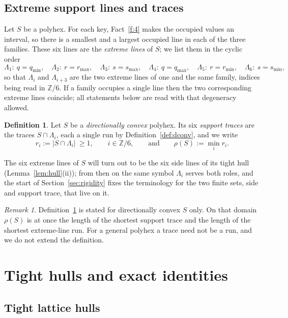 \documentclass[11pt]{article}
\theoremstyle{plain}
\theoremstyle{definition}
\newtheorem{definition}[theorem]{Definition}
\theoremstyle{remark}
\newtheorem{remark}[theorem]{Remark}
\newcommand{\Z}{\mathbb{Z}}
\begin{document}
\subsection{Extreme support lines and traces}\label{sec:2.3}

Let \(S\) be a polyhex. For each key, Fact~\ref{f:4} makes the occupied values an interval,
so there is a smallest and a largest occupied line in each of the three families. These six
lines are the \emph{extreme lines} of \(S\); we list them in the cyclic order
\[
   \Lambda_{1}:\ q=q_{\min},\quad
   \Lambda_{2}:\ r=r_{\max},\quad
   \Lambda_{3}:\ s=s_{\max},\quad
   \Lambda_{4}:\ q=q_{\max},\quad
   \Lambda_{5}:\ r=r_{\min},\quad
   \Lambda_{6}:\ s=s_{\min},
\]
so that \(\Lambda_{i}\) and \(\Lambda_{i+3}\) are the two extreme lines of one and the same
family, indices being read in \(\Z/6\). If a family occupies a single line then the two
corresponding extreme lines coincide; all statements below are read with that degeneracy
allowed.

\begin{definition}\label{def:traces}
Let \(S\) be a \emph{directionally convex} polyhex. Its six \emph{support traces} are the
traces \(S\cap\Lambda_{i}\), each a single run by Definition~\ref{def:dconv}, and we write
\[
   r_{i}:=|S\cap\Lambda_{i}|\ \ge 1 ,\qquad i\in\Z/6,
   \qquad\text{and}\qquad
   \rho(S):=\min_{i} r_{i} .
\]
\end{definition}

The six extreme lines of \(S\) will turn out to be the six side lines of its tight hull
(Lemma~\ref{lem:hull}(ii)); from then on the same symbol \(\Lambda_i\) serves both
roles, and the start of Section~\ref{sec:rigidity} fixes the terminology for the two
finite sets, side and support trace, that live on it.

\begin{remark}\label{rem:rho}
Definition~\ref{def:traces} is stated for directionally convex \(S\) only. On that domain \(\rho(S)\) is at once the length of the shortest support trace and the
length of the shortest extreme-line run. For
a general polyhex a trace need not be a run, and we do not extend the definition.
\end{remark}


\section{Tight hulls and exact identities}\label{sec:hulls}

\subsection{Tight lattice hulls}\label{sec:2.4}
\end{document}
